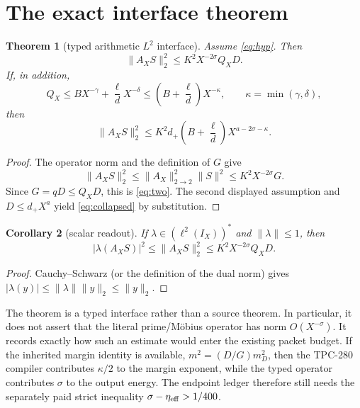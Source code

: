 \documentclass[11pt]{article}
\newtheorem{theorem}{Theorem}
\newtheorem{corollary}[theorem]{Corollary}
\begin{document}
\section{The exact interface theorem}

\begin{theorem}[typed arithmetic $L^2$ interface]
Assume \eqref{eq:hyp}.  Then
\begin{equation}
 \|A_XS\|_2^2
 \le K^2X^{-2\sigma}Q_XD.
 \label{eq:two}
\end{equation}
If, in addition,
\[
 Q_X\le BX^{-\gamma}+\frac{\ell}{d}X^{-\delta}
 \le \left(B+\frac{\ell}{d}\right)X^{-\kappa},
 \qquad \kappa=\min(\gamma,\delta),
\]
then
\begin{equation}
 \|A_XS\|_2^2
 \le K^2d_+\left(B+\frac{\ell}{d}\right)
 X^{a-2\sigma-\kappa}.
 \label{eq:collapsed}
\end{equation}
\end{theorem}

\begin{proof}
The operator norm and the definition of $G$ give
\[
 \|A_XS\|_2^2\le \|A_X\|_{2\to2}^2\|S\|^2
 \le K^2X^{-2\sigma}G.
\]
Since $G=qD\le Q_XD$, this is \eqref{eq:two}.  The second displayed
assumption and $D\le d_+X^a$ yield \eqref{eq:collapsed} by substitution.
\end{proof}

\begin{corollary}[scalar readout]
If $\lambda\in(\ell^2(I_X))^*$ and $\|\lambda\|\le1$, then
\begin{equation}
 |\lambda(A_XS)|^2\le \|A_XS\|_2^2
 \le K^2X^{-2\sigma}Q_XD.
 \label{eq:scalar}
\end{equation}
\end{corollary}

\begin{proof}
Cauchy--Schwarz (or the definition of the dual norm) gives
$|\lambda(y)|\le\|\lambda\|\|y\|_2\le\|y\|_2$.
\end{proof}

The theorem is a typed interface rather than a source theorem.  In particular,
it does not assert that the literal prime/Möbius operator has norm
$O(X^{-\sigma})$.  It records exactly how such an estimate would enter the
existing packet budget.  If the inherited margin identity is available,
$m^2=(D/G)m_D^2$, then the TPC-280 compiler contributes $\kappa/2$ to the
margin exponent, while the typed operator contributes $\sigma$ to the output
energy.  The endpoint ledger therefore still needs the separately paid strict
inequality $\sigma-\eta_{\rm eff}>1/400$.
\end{document}
